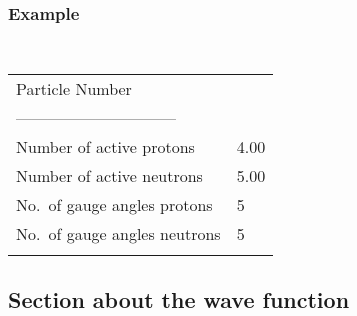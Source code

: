 \documentclass[a4paper,11pt]{article}
\begin{document}
\subsubsection*{Example}
\begin{center}
\tt
\begin{tabular}{|ll|}
\hline
Particle Number                &      \\
------------------------------ &      \\
Number of active protons       &4.00  \\
Number of active neutrons      &5.00  \\
No.\ of gauge angles protons   &5     \\
No.\ of gauge angles neutrons  &5     \\
                               &      \\
\hline
\end{tabular}
\end{center}

%
%
\subsection{Section about the wave function}
\end{document}
